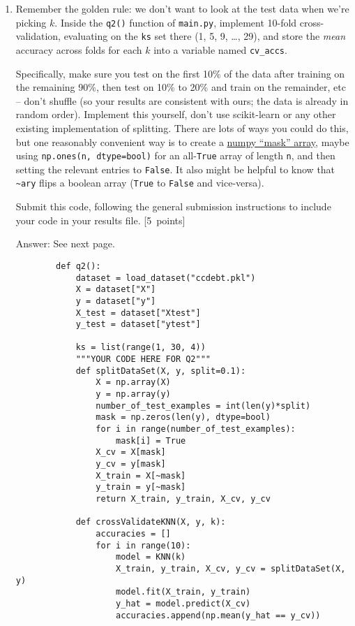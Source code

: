 \documentclass{article}
\newcommand{\blu}[1]{{\textcolor{blu}{#1}}}
\newcommand{\gre}[1]{\textcolor{gre}{#1}}
\newcommand\ans[1]{\par\gre{Answer: #1}}
\let\ask\blu
\newcommand\pts[1]{\textcolor{pointscolour}{[#1~points]}}
\begin{document}
    \begin{enumerate}
        \item Remember the golden rule: we don't want to look at the test data when we're picking $k$. Inside the \texttt{q2()} function of \texttt{main.py}, implement 10-fold cross-validation, evaluating on the \texttt{ks} set there (1, 5, 9, \dots, 29), and store the \emph{mean} accuracy across folds for each $k$ into a variable named \texttt{cv\_accs}.
        

        Specifically, make sure you test on the first 10\% of the data after training on the remaining 90\%, then test on 10\% to 20\% and train on the remainder, etc -- don't shuffle (so your results are consistent with ours; the data is already in random order). Implement this yourself, don't use scikit-learn or any other existing implementation of splitting. There are lots of ways you could do this, but one reasonably convenient way is to create a \href{https://numpy.org/doc/stable/user/basics.indexing.html#boolean-or-mask-index-arrays}{numpy ``mask'' array}, maybe using \texttt{np.ones(n, dtype=bool)} for an all-\texttt{True} array of length \texttt{n}, and then setting the relevant entries to \texttt{False}. It also might be helpful to know that \texttt{\textasciitilde ary} flips a boolean array (\texttt{True} to \texttt{False} and vice-versa).
    
        \ask{Submit this code}, following the general submission instructions to include your code in your results file. \pts{5}
        \ans{See next page.}
        \newpage
        \begin{verbatim}
        def q2():
            dataset = load_dataset("ccdebt.pkl")
            X = dataset["X"]
            y = dataset["y"]
            X_test = dataset["Xtest"]
            y_test = dataset["ytest"]
        
            ks = list(range(1, 30, 4))
            """YOUR CODE HERE FOR Q2"""
            def splitDataSet(X, y, split=0.1):
                X = np.array(X)
                y = np.array(y)
                number_of_test_examples = int(len(y)*split)
                mask = np.zeros(len(y), dtype=bool)
                for i in range(number_of_test_examples):
                    mask[i] = True
                X_cv = X[mask]
                y_cv = y[mask]
                X_train = X[~mask]
                y_train = y[~mask]
                return X_train, y_train, X_cv, y_cv
        
            def crossValidateKNN(X, y, k):
                accuracies = []
                for i in range(10):
                    model = KNN(k)
                    X_train, y_train, X_cv, y_cv = splitDataSet(X, y)
                    model.fit(X_train, y_train)
                    y_hat = model.predict(X_cv)
                    accuracies.append(np.mean(y_hat == y_cv))


\end{verbatim}
\end{enumerate}
\end{document}
